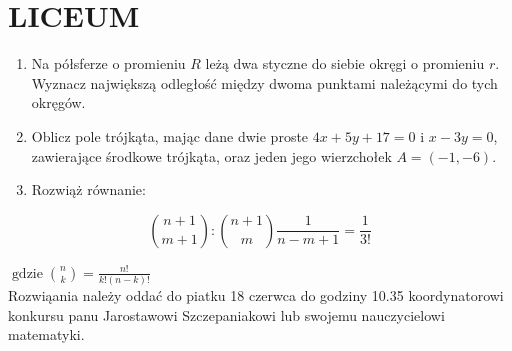 \documentclass[10pt]{article}
\begin{document}
\section*{LICEUM}
\begin{enumerate}
  \item Na półsferze o promieniu \(R\) leżą dwa styczne do siebie okręgi o promieniu \(r\). Wyznacz największą odległość między dwoma punktami należącymi do tych okręgów.
  \item Oblicz pole trójkąta, mając dane dwie proste \(4 x+5 y+17=0\) i \(x-3 y=0\), zawierające środkowe trójkąta, oraz jeden jego wierzchołek \(A=(-1,-6)\).
  \item Rozwiąż równanie:
\end{enumerate}

\[
\binom{n+1}{m+1}:\binom{n+1}{m} \frac{1}{n-m+1}=\frac{1}{3!}
\]

\(\operatorname{gdzie}\binom{n}{k}=\frac{n!}{k!(n-k)!}\)\\
Rozwiąania należy oddać do piatku 18 czerwca do godziny 10.35 koordynatorowi konkursu panu Jarostawowi Szczepaniakowi lub swojemu nauczycielowi matematyki.
\end{document}
